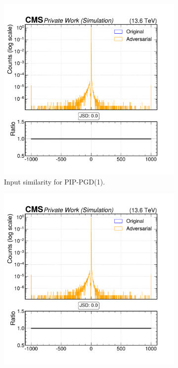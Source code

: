 \begin{figure}[htbp]
  \centering
  \begin{subfigure}[t]{0.32\textwidth}
    \includegraphics[width=\linewidth]{media/output/features/compare/combined_it_1/cmp_vtx_arr_sv_normchi2.pdf}
    \caption*{Input similarity for PIP-PGD(1).}
  \end{subfigure}\hfill
  \begin{subfigure}[t]{0.32\textwidth}
    \includegraphics[width=\linewidth]{media/output/features/compare/combined_it_2/cmp_vtx_arr_sv_normchi2.pdf}

\end{subfigure}
\end{figure}
